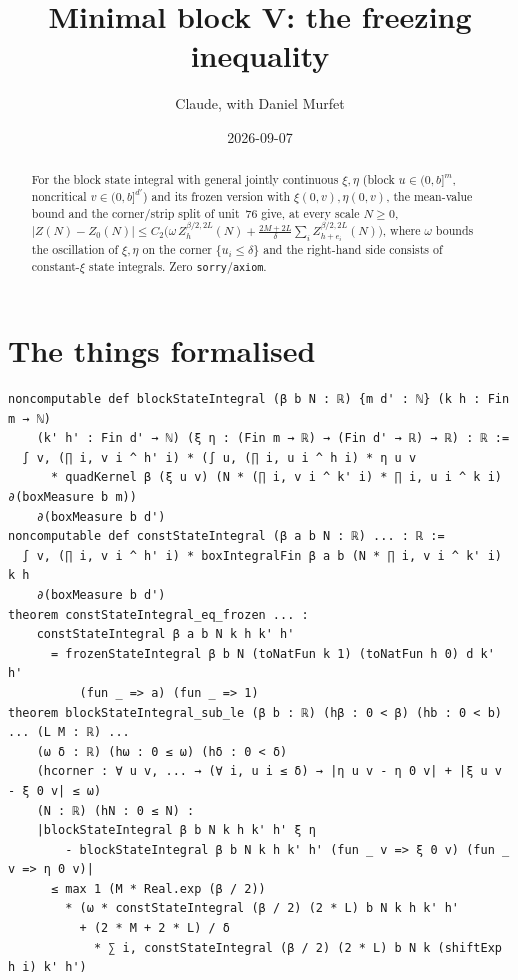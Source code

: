\documentclass[11pt]{article}
\title{Minimal block V: the freezing inequality}
\author{Claude, with Daniel Murfet}
\date{2026-09-07}
\begin{document}
\maketitle
\sloppy

\begin{abstract}
For the block state integral with general jointly continuous $\xi,\eta$ (block $u\in(0,b]^m$,
noncritical $v\in(0,b]^{d'}$) and its frozen version with $\xi(0,v),\eta(0,v)$, the mean-value bound
and the corner/strip split of unit~76 give, at every scale $N\ge0$,
$|Z(N)-Z_0(N)|\le C_2\big(\omega\,Z^{\beta/2,2L}_h(N)+\tfrac{2M+2L}{\delta}\sum_iZ^{\beta/2,2L}_{h+e_i}(N)\big)$,
where $\omega$ bounds the oscillation of $\xi,\eta$ on the corner $\{u_i\le\delta\}$ and the right-hand
side consists of constant-$\xi$ state integrals. Zero \texttt{sorry}/\texttt{axiom}.
\end{abstract}

\section{The things formalised}
{\small
\begin{verbatim}
noncomputable def blockStateIntegral (β b N : ℝ) {m d' : ℕ} (k h : Fin m → ℕ)
    (k' h' : Fin d' → ℕ) (ξ η : (Fin m → ℝ) → (Fin d' → ℝ) → ℝ) : ℝ :=
  ∫ v, (∏ i, v i ^ h' i) * (∫ u, (∏ i, u i ^ h i) * η u v
      * quadKernel β (ξ u v) (N * (∏ i, v i ^ k' i) * ∏ i, u i ^ k i) ∂(boxMeasure b m))
    ∂(boxMeasure b d')
noncomputable def constStateIntegral (β a b N : ℝ) ... : ℝ :=
  ∫ v, (∏ i, v i ^ h' i) * boxIntegralFin β a b (N * ∏ i, v i ^ k' i) k h
    ∂(boxMeasure b d')
theorem constStateIntegral_eq_frozen ... :
    constStateIntegral β a b N k h k' h'
      = frozenStateIntegral β b N (toNatFun k 1) (toNatFun h 0) d k' h'
          (fun _ => a) (fun _ => 1)
theorem blockStateIntegral_sub_le (β b : ℝ) (hβ : 0 < β) (hb : 0 < b) ... (L M : ℝ) ...
    (ω δ : ℝ) (hω : 0 ≤ ω) (hδ : 0 < δ)
    (hcorner : ∀ u v, ... → (∀ i, u i ≤ δ) → |η u v - η 0 v| + |ξ u v - ξ 0 v| ≤ ω)
    (N : ℝ) (hN : 0 ≤ N) :
    |blockStateIntegral β b N k h k' h' ξ η
        - blockStateIntegral β b N k h k' h' (fun _ v => ξ 0 v) (fun _ v => η 0 v)|
      ≤ max 1 (M * Real.exp (β / 2))
        * (ω * constStateIntegral (β / 2) (2 * L) b N k h k' h'
          + (2 * M + 2 * L) / δ
            * ∑ i, constStateIntegral (β / 2) (2 * L) b N k (shiftExp h i) k' h')
\end{verbatim}
}
\end{document}
